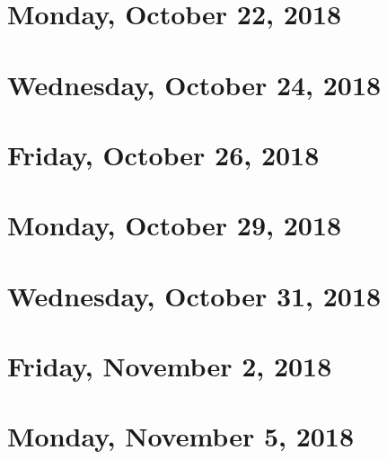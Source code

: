 \documentclass[reqno]{amsart}
\begin{document}
\section{Monday, October 22, 2018}
    
    
\section{Wednesday, October 24, 2018}
    

\section{Friday, October 26, 2018}
    

\section{Monday, October 29, 2018}
    
    
\section{Wednesday, October 31, 2018}
    

\section{Friday, November 2, 2018}
    

\section{Monday, November 5, 2018}
    
\end{document}
